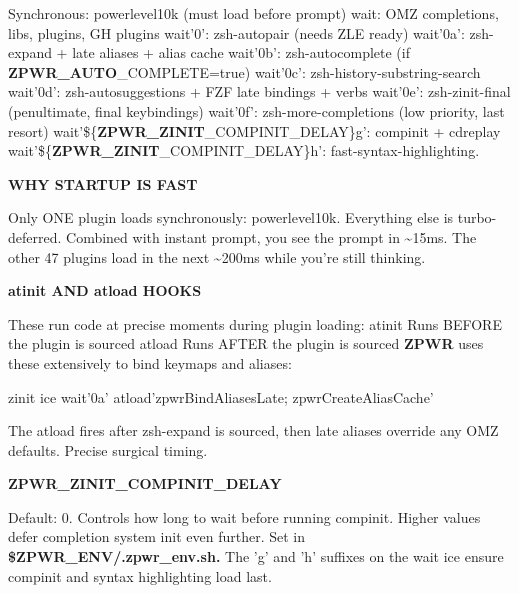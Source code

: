 \documentclass[11pt,a4paper,twoside]{book}
\begin{document}
Synchronous:  powerlevel10k (must load before prompt) wait:          OMZ completions, libs, plugins, GH plugins wait'0':       zsh-autopair (needs ZLE ready) wait'0a':      zsh-expand + late aliases + alias cache wait'0b':      zsh-autocomplete (if \textbf{ZPWR\_AUTO}\_COMPLETE=true) wait'0c':      zsh-history-substring-search wait'0d':      zsh-autosuggestions + FZF late bindings + verbs wait'0e':      zsh-zinit-final (penultimate, final keybindings) wait'0f':      zsh-more-completions (low priority, last resort) wait'\$\{\textbf{ZPWR\_ZINIT}\_COMPINIT\_DELAY\}g':  compinit + cdreplay wait'\$\{\textbf{ZPWR\_ZINIT}\_COMPINIT\_DELAY\}h':  fast-syntax-highlighting.


\vspace{12pt}
{\bfseries\color{neonyellow} WHY STARTUP IS FAST}\vspace{4pt}

Only ONE plugin loads synchronously: powerlevel10k. Everything else is turbo-deferred. Combined with instant prompt, you see the prompt in \textasciitilde{}15ms. The other 47 plugins load in the next \textasciitilde{}200ms while you're still thinking.


\vspace{12pt}
{\bfseries\color{neonyellow} atinit AND atload HOOKS}\vspace{4pt}

These run code at precise moments during plugin loading: atinit   Runs BEFORE the plugin is sourced atload   Runs AFTER the plugin is sourced \textbf{ZPWR} uses these extensively to bind keymaps and aliases:

\begin{codebox}
\color{neongreen}zinit ice wait'0a' atload'zpwrBindAliasesLate; zpwrCreateAliasCache'\\
\end{codebox}

The atload fires after zsh-expand is sourced, then late aliases override any OMZ defaults. Precise surgical timing.


\vspace{12pt}
{\bfseries\color{neonyellow} \textbf{ZPWR\_ZINIT}\_COMPINIT\_DELAY}\vspace{4pt}

Default: 0. Controls how long to wait before running compinit. Higher values defer completion system init even further. Set in \textbf{\$ZPWR\_ENV/.zpwr\_env.sh.} The 'g' and 'h' suffixes on the wait ice ensure compinit and syntax highlighting load last.
\end{document}
